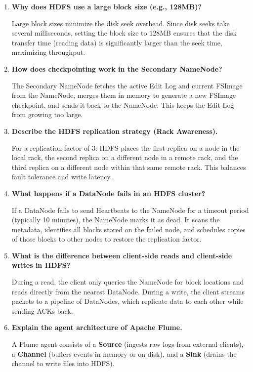 \documentclass[12pt,a4paper]{article}
\newcommand{\Q}[1]{\textbf{#1}\par\noindent\ignorespaces}
\begin{document}
\begin{tcolorbox}[exambox, title={\textbf{Frequently Asked / Viva Questions}}]
\begin{enumerate}[leftmargin=*, topsep=0pt, label=\textbf{Q\arabic*.}, itemsep=5pt]
  \item \Q{Why does HDFS use a large block size (e.g., 128MB)?}
        Large block sizes minimize the disk seek overhead. Since disk seeks take several milliseconds, setting the block size to 128MB ensures that the disk transfer time (reading data) is significantly larger than the seek time, maximizing throughput.
        
  \item \Q{How does checkpointing work in the Secondary NameNode?}
        The Secondary NameNode fetches the active Edit Log and current FSImage from the NameNode, merges them in memory to generate a new FSImage checkpoint, and sends it back to the NameNode. This keeps the Edit Log from growing too large.
        
  \item \Q{Describe the HDFS replication strategy (Rack Awareness).}
        For a replication factor of 3: HDFS places the first replica on a node in the local rack, the second replica on a different node in a remote rack, and the third replica on a different node within that same remote rack. This balances fault tolerance and write latency.
        
  \item \Q{What happens if a DataNode fails in an HDFS cluster?}
        If a DataNode fails to send Heartbeats to the NameNode for a timeout period (typically 10 minutes), the NameNode marks it as dead. It scans the metadata, identifies all blocks stored on the failed node, and schedules copies of those blocks to other nodes to restore the replication factor.
        
  \item \Q{What is the difference between client-side reads and client-side writes in HDFS?}
        During a read, the client only queries the NameNode for block locations and reads directly from the nearest DataNode. During a write, the client streams packets to a pipeline of DataNodes, which replicate data to each other while sending ACKs back.
        
  \item \Q{Explain the agent architecture of Apache Flume.}
        A Flume agent consists of a \textbf{Source} (ingests raw logs from external clients), a \textbf{Channel} (buffers events in memory or on disk), and a \textbf{Sink} (drains the channel to write files into HDFS).
        

\end{enumerate}
\end{tcolorbox}
\end{document}
